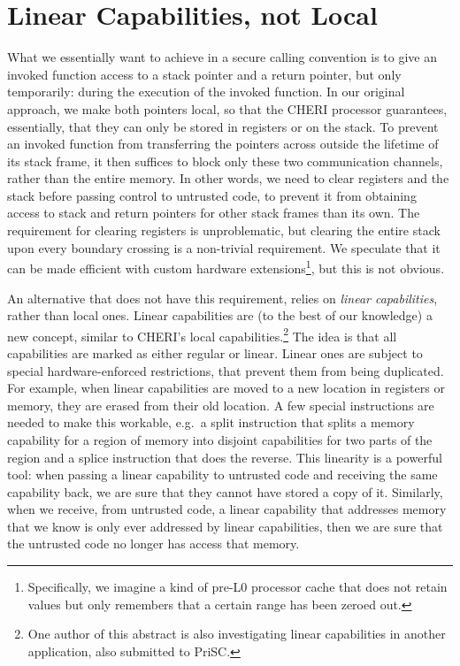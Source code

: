 \documentclass[sigplan, review]{acmart}
\begin{document}
\section{Linear Capabilities, not Local}
What we essentially want to achieve in a secure calling convention is to give an invoked function access to a stack pointer and a return pointer, but only temporarily: during the execution of the invoked function. 
In our original approach, we make both pointers local, so that the CHERI processor guarantees, essentially, that they can only be stored in registers or on the stack.
To prevent an invoked function from transferring the pointers across outside the lifetime of its stack frame, it then suffices to block only these two communication channels, rather than the entire memory.
In other words, we need to clear registers and the stack before passing control to untrusted code, to prevent it from obtaining access to stack and return pointers for other stack frames than its own.
The requirement for clearing registers is unproblematic, but clearing the entire stack upon every boundary crossing is a non-trivial requirement.
We speculate that it can be made efficient with custom hardware extensions\footnote{Specifically, we imagine a kind of pre-L0 processor cache that does not retain values but only remembers that a certain range has been zeroed out.}, but this is not obvious.

An alternative that does not have this requirement, relies on \emph{linear capabilities}, rather than local ones.
Linear capabilities are (to the best of our knowledge) a new concept, similar to CHERI's local capabilities.\footnote{One author of this abstract is also investigating linear capabilities in another application, also submitted to PriSC.}
The idea is that all capabilities are marked as either regular or linear.
Linear ones are subject to special hardware-enforced restrictions, that prevent them from being duplicated.
For example, when linear capabilities are moved to a new location in registers or memory, they are erased from their old location.
A few special instructions are needed to make this workable, e.g.\ a split instruction that splits a memory capability for a region of memory into disjoint capabilities for two parts of the region and a splice instruction that does the reverse.
This linearity is a powerful tool: when passing a linear capability to untrusted code and receiving the same capability back, we are sure that they cannot have stored a copy of it.
Similarly, when we receive, from untrusted code, a linear capability that addresses memory that we know is only ever addressed by linear capabilities, then we are sure that the untrusted code no longer has access that memory.
\end{document}
